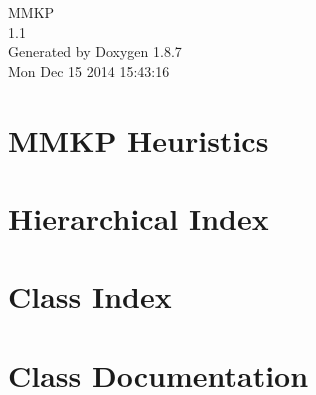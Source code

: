 \documentclass[twoside]{book}
\newcommand{\+}{\discretionary{\mbox{\scriptsize$\hookleftarrow$}}{}{}}
\newcommand{\clearemptydoublepage}{%
  \newpage{\pagestyle{empty}\cleardoublepage}%
}
\begin{document}
\hypersetup{pageanchor=false,
             bookmarks=true,
             bookmarksnumbered=true,
             pdfencoding=unicode
            }
\begin{titlepage}
\vspace*{7cm}
\begin{center}%
{\Large M\+M\+K\+P \\[1ex]\large 1.\+1 }\\
\vspace*{1cm}
{\large Generated by Doxygen 1.8.7}\\
\vspace*{0.5cm}
{\small Mon Dec 15 2014 15:43:16}\\
\end{center}
\end{titlepage}
\clearemptydoublepage
\tableofcontents
\clearemptydoublepage
{}
\hypersetup{pageanchor=true}

\chapter{M\+M\+K\+P Heuristics}
\label{index}\hypertarget{index}{}
\chapter{Hierarchical Index}

\chapter{Class Index}

\chapter{Class Documentation}

































\newpage
{}
{}
\printindex
\end{document}
